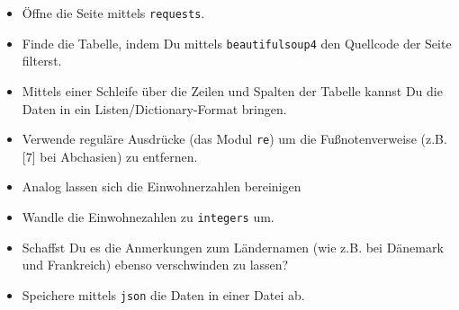 \documentclass[a4paper]{article}
\newcommand{\pybw}[1]{\texttt{#1}}
\begin{document}
\begin{itemize}
	\item Öffne die Seite mittels \pybw{requests}.
	\item Finde die Tabelle, indem Du mittels \pybw{beautifulsoup4} den Quellcode der Seite filterst.
	\item Mittels einer Schleife über die Zeilen und Spalten der Tabelle kannst Du die Daten in ein Listen/Dictionary-Format bringen. 
	\item Verwende reguläre Ausdrücke (das Modul \pybw{re}) um die Fußnotenverweise (z.B. [7] bei Abchasien) zu entfernen. 
	\item Analog lassen sich die Einwohnerzahlen bereinigen
	\item Wandle die Einwohnezahlen zu \pybw{integers} um. 
	\item Schaffst Du es die Anmerkungen zum Ländernamen (wie z.B. bei Dänemark und Frankreich) ebenso verschwinden zu lassen? 
	\item Speichere mittels \pybw{json} die Daten in einer Datei ab. 
\end{itemize}
\end{document}
